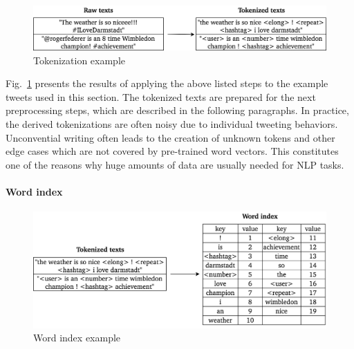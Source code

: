 \begin{figure}[h]
  \includegraphics[width=\textwidth]{img/text_preprocessing_1}
  \caption{Tokenization example}
\label{fig:tokenization}
\end{figure}

Fig.~\ref{fig:tokenization} presents the results of applying the above listed
steps to the example tweets used in this section.
The tokenized texts are prepared for the next preprocessing steps, which
are described in the following paragraphs.
In practice, the derived tokenizations are often noisy due to individual tweeting
behaviors.
Unconvential writing often leads to the creation of unknown tokens and other
edge cases which are not covered by pre-trained word vectors.
This constitutes one of the reasons why huge amounts of data are usually needed
for NLP tasks.

\paragraph{Word index}
\label{sub:word_index}

\begin{figure}[h]
  \includegraphics[width=\textwidth]{img/text_preprocessing_2}
  \caption{Word index example}
\label{fig:word_index}
\end{figure}


